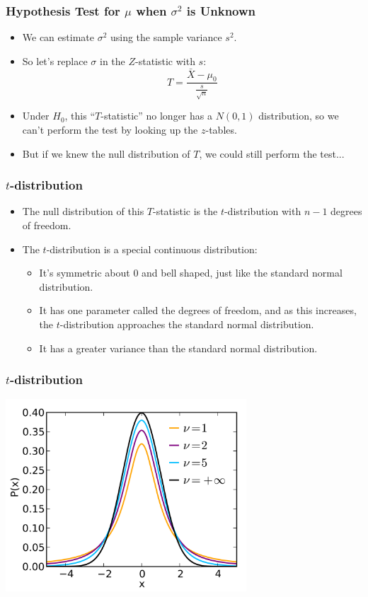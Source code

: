 \documentclass[14pt]{beamer}
\begin{document}
\begin{frame}
	\frametitle{Hypothesis Test for $\mu$ when $\sigma^2$ is Unknown}
	
	\begin{itemize}[label={\color{blue}$\blacktriangleright$}]
		\item {\color{red}We can estimate $\sigma^2$ using the sample variance $s^2$.}
		\item So let's replace $\sigma$ in the $Z$-statistic with $s$:
		\[
		T = \frac{\bar{X} - \mu_0}{\frac{s}{\sqrt{n}}}
		\]
		\item {\color{blue}Under $H_0$, this ``$T$-statistic'' no longer has a $N(0,1)$ distribution, so we can't perform the test by looking up the $z$-tables.}
		\item But if we knew the null distribution of $T$, we could still perform the test...
	\end{itemize}
	
\end{frame}
\begin{frame}
	\frametitle{$t$-distribution}
	
	\begin{itemize}[label={\color{blue}$\blacktriangleright$}]
		\item The null distribution of this $T$-statistic is the $t$-distribution with $n - 1$ degrees of freedom.
		\item The $t$-distribution is a special continuous distribution:
		\begin{itemize}[label={\color{blue}$\blacktriangleright$}]
			\item It's symmetric about 0 and bell shaped, just like the standard normal distribution.
			\item It has one parameter called the degrees of freedom, and as this increases, the $t$-distribution approaches the standard normal distribution.
			\item It has a greater variance than the standard normal distribution.
		\end{itemize}
	\end{itemize}
	
\end{frame}
\begin{frame}
	\frametitle{$t$-distribution}
	\centering
	\includegraphics[width=9cm]{t.png}	
\end{frame}
\end{document}
